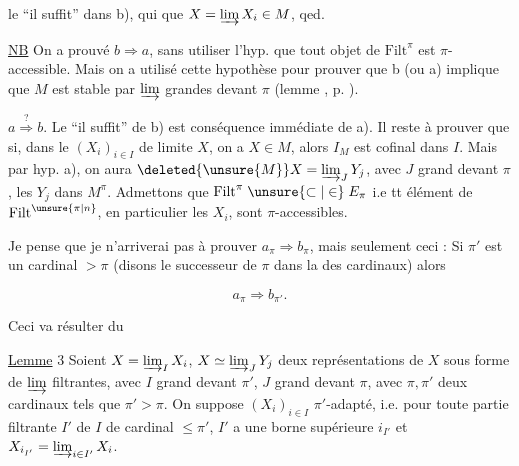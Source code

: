 le ``il suffit'' dans b), qui   que $X=\varinjlim X_i\in M$, qed.

\uline{NB} On a prouvé $b\Rightarrow a$, sans utiliser l'hyp.  que tout objet de $\mathrm{Filt}^{\pi}$ est $\pi$-accessible. Mais on a utilisé cette hypothèse pour prouver que b  (ou a) implique que $M$ est stable par $\varinjlim$ grandes devant $\pi$ (lemme , p. ).

$a\overset{?}{\Longrightarrow}b$.  Le ``il suffit'' de b) est conséquence immédiate de a). Il reste à prouver que si, dans le   $(X_i)_{i\in I}$ de limite $X$, on a $X\in M$, alors $I_M$ est cofinal dans $I$. Mais par hyp. a), on aura $\deleted{\unsure{M}} X=\varinjlim_J Y_j$, avec $J$ grand devant $\pi$, les $Y_j$ dans $M^\pi$.  Admettons que $\mathrm{Filt}^\pi\mathrel{\unsure{\subset|\in}} E_\pi$ i.e tt élément de $\mathrm{Filt}^{\unsure{\pi|n}}$, en particulier les $X_i$, sont  $\pi$-accessibles.

Je pense que je n'arriverai pas à prouver $a_\pi\Rightarrow b_\pi$, mais seulement ceci : Si $\pi'$ est un cardinal $>\pi$ (disons le successeur de $\pi$ \unsure{$\aleph_{\unsure{\gamma|\eta}}$} dans la   des cardinaux) alors

\[
 a_\pi\Longrightarrow b_{\pi'}.
\]




Ceci va résulter du

\uline{Lemme} 3 Soient $X=\varinjlim_I X_i$, $X\simeq\varinjlim_J Y_j$ deux représentations de $X$ sous forme de $\varinjlim$ filtrantes, avec $I$ grand devant $\pi'$, $J$ grand devant $\pi$, avec $\pi,\pi'$ deux cardinaux tels que $\pi'>\pi$. On suppose $(X_i)_{i\in I}$ $\pi'$-adapté, i.e. pour toute partie filtrante $I'$ de $I$ de cardinal $\leq\pi'$, $I'$ a une borne supérieure $i_{I'}$ et $X_{i_{I'}}=\varinjlim_{i\in I'} X_i$.

